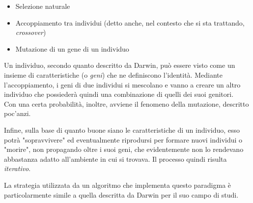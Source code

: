     \begin{itemize}
        \item Selezione naturale
        \item Accoppiamento tra individui (detto anche, nel contesto che si sta trattando, \textit{crossover})
        \item Mutazione di un gene di un individuo
    \end{itemize}

    Un individuo, secondo quanto descritto da Darwin, può essere visto come un insieme di caratteristiche (o \textit{geni}) che ne definiscono l'identità. Mediante l'accoppiamento, i geni di due individui si mescolano e vanno a creare un altro individuo che possiederà quindi una combinazione di quelli dei suoi genitori. \\
    Con una certa probabilità, inoltre, avviene il fenomeno della mutazione, descritto poc'anzi.

    Infine, sulla base di quanto buone siano le caratteristiche di un individuo, esso potrà "sopravvivere" ed eventualmente riprodursi per formare nuovi individui o "morire", non propagando oltre i suoi geni, che evidentemente non lo rendevano abbastanza adatto all'ambiente in cui si trovava. Il processo quindi risulta \textit{iterativo}.

    La strategia utilizzata da un algoritmo che implementa questo paradigma è particolarmente simile a quella descritta da Darwin per il suo campo di studi.

